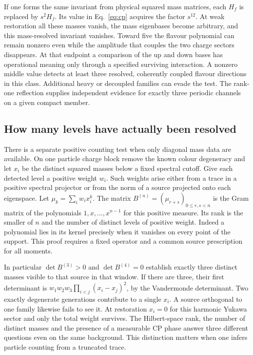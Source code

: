 \documentclass[aps,prd,reprint,onecolumn,nofootinbib,amsmath,amssymb]{revtex4-2}
\begin{document}
If one forms the same invariant from physical squared mass matrices, each $H_f$ is replaced by $s^2 H_f$. Its value in Eq.~\eqref{eq:cp} acquires the factor $s^{12}$. At weak restoration all these masses vanish, the mass eigenbases become arbitrary, and this mass-resolved invariant vanishes. Toward five the flavour polynomial can remain nonzero even while the amplitude that couples the two charge sectors disappears. At that endpoint a comparison of the up and down bases has operational meaning only through a specified surviving interaction. A nonzero middle value detects at least three resolved, coherently coupled flavour directions in this class. Additional heavy or decoupled families can evade the test. The rank-one reflection supplies independent evidence for exactly three periodic channels on a given compact member.

\subsection{How many levels have actually been resolved}
There is a separate positive counting test when only diagonal mass data are available. On one particle charge block remove the known colour degeneracy and let $x_i$ be the distinct squared masses below a fixed spectral cutoff. Give each detected level a positive weight $w_i$. Such weights arise either from a trace in a positive spectral projector or from the norm of a source projected onto each eigenspace. Let $\mu_k=\sum_iw_i x_i^k$. The matrix $B^{(n)}=(\mu_{r+s})_{0\le r,s<n}$ is the Gram matrix of the polynomials $1,x,\ldots,x^{n-1}$ for this positive measure. Its rank is the smaller of $n$ and the number of distinct levels of positive weight. Indeed a polynomial lies in its kernel precisely when it vanishes on every point of the support. This proof requires a fixed operator and a common source prescription for all moments.

In particular $\det B^{(3)}>0$ and $\det B^{(4)}=0$ establish exactly three distinct masses visible to that source in that window. If there are three, their first determinant is $w_1w_2w_3\prod_{i<j}(x_i-x_j)^2$, by the Vandermonde determinant. Two exactly degenerate generations contribute to a single $x_i$. A source orthogonal to one family likewise fails to see it. At restoration $x_i=0$ for this harmonic Yukawa sector and only the total weight survives. The Hilbert-space rank, the number of distinct masses and the presence of a measurable CP phase answer three different questions even on the same background. This distinction matters when one infers particle counting from a truncated trace.
\end{document}
